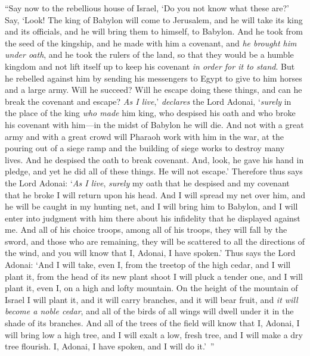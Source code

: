 \begin{biblechapter}
\verse “Say now to the rebellious house of Israel, ‘Do you not know what these are?’ Say, ‘Look! The king of Babylon will come to Jerusalem, and he will take its king and its officials, and he will bring them to himself, to Babylon.
\verse And he took from the seed of the kingship, and he made with him a covenant, and \textit{he brought him under oath}, and he took the rulers of the land,
\verse so that they would be a humble kingdom and not lift itself up to keep his covenant \textit{in order for it to stand}.
\verse But he rebelled against him by sending his messengers to Egypt to give to him horses and a large army. Will he succeed? Will he escape doing these things, and can he break the covenant and escape?
\verse \textit{As I live},’ \textit{declares} the Lord Adonai, ‘\textit{surely} in the place of the king \textit{who made} him king, who despised his oath and who broke his covenant with him—in the midst of Babylon he will die.
\verse And not with a great army and with a great crowd will Pharaoh work with him in the war, at the pouring out of a siege ramp and the building of siege works to destroy many lives.
\verse And he despised the oath to break covenant. And, look, he gave his hand in pledge, and yet he did all of these things. He will not escape.’
\verse Therefore thus says the Lord Adonai: ‘\textit{As I live}, \textit{surely} my oath that he despised and my covenant that he broke I will return upon his head.
\verse And I will spread my net over him, and he will be caught in my hunting net, and I will bring him to Babylon, and I will enter into judgment with him there about his infidelity that he displayed against me.
\verse And all of his choice troops, among all of his troops, they will fall by the sword, and those who are remaining, they will be scattered to all the directions of the wind, and you will know that I, Adonai, I have spoken.’
\verse Thus says the Lord Adonai: ‘And I will take, even I, from the treetop of the high cedar, and I will plant it, from the head of its new plant shoot I will pluck a tender one, and I will plant it, even I, on a high and lofty mountain.
\verse On the height of the mountain of Israel I will plant it, and it will carry branches, and it will bear fruit, and \textit{it will become a noble cedar}, and all of the birds of all wings will dwell under it in the shade of its branches.
\verse And all of the trees of the field will know that I, Adonai, I will bring low a high tree, and I will exalt a low, fresh tree, and I will make a dry tree flourish. I, Adonai, I have spoken, and I will do it.’ ”
\end{biblechapter}


